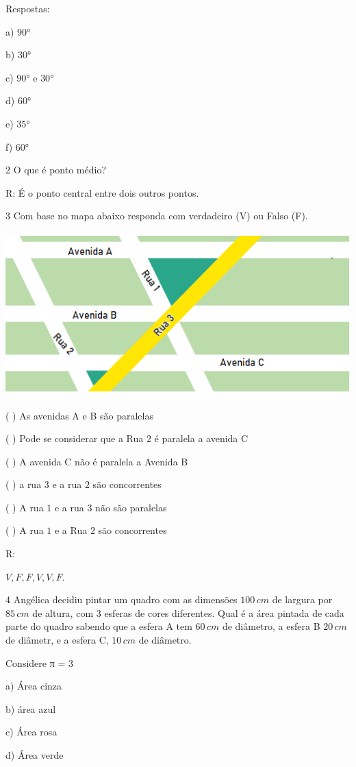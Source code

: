 Respostas:

a) $90$°

b) $30$°

c) $90$° e $30$°

d) $60$°

e) $35$°

f) $60$°

\num{2}  O que é ponto médio?

R: É o ponto central entre dois outros pontos.

\num{3}  Com base no mapa abaixo responda com verdadeiro (V) ou Falso (F).

\includegraphics[width=5.47917in,height=2.48958in]{./imgSAEB_6_MAT/media/image53.png}

( ) As avenidas A e B são paralelas

( ) Pode se considerar que a Rua $2$ é paralela a avenida C

( ) A avenida C não é paralela a Avenida B

( ) a rua $3$ e a rua $2$ são concorrentes

( ) A rua $1$ e a rua $3$ não são paralelas

( ) A rua $1$ e a Rua $2$ são concorrentes

R:

$V, F, F, V, V, F$.

\num{4}  Angélica decidiu pintar um quadro com as dimensões $100\,cm$ de largura
por $85\,cm$ de altura, com $3$ esferas de cores diferentes. Qual é a área
pintada de cada parte do quadro sabendo que a esfera A tem $60\,cm$ de
diâmetro, a esfera B $20\,cm$ de diâmetr, e a esfera C, $10\,cm$ de diâmetro.

Considere π = $3$

a) Área cinza

b) área azul

c) Área rosa

d) Área verde

